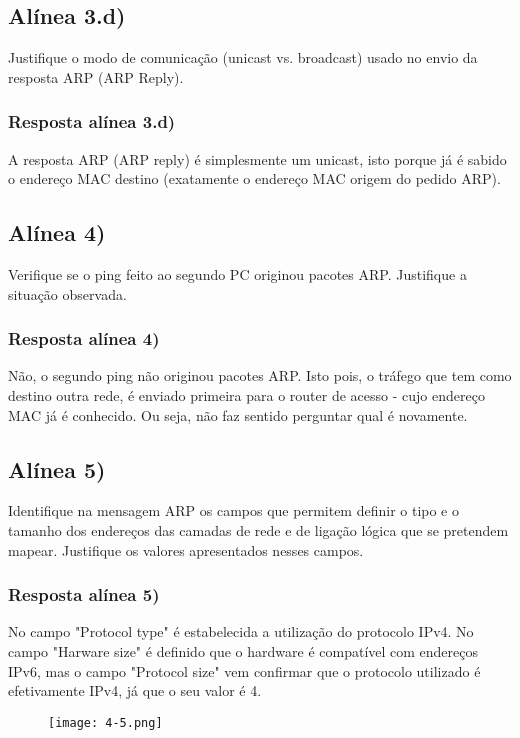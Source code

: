 \documentclass{article}
\begin{document}
\subsection{Alínea 3.d)}

Justifique o modo de comunicação (unicast vs. broadcast) usado no envio da resposta ARP (ARP Reply).

\subsubsection{Resposta alínea 3.d)}

A resposta ARP (ARP reply) é simplesmente um unicast, isto porque já é sabido o endereço MAC destino (exatamente o endereço MAC origem do pedido ARP).

\subsection{Alínea 4)}

Verifique se o ping feito ao segundo PC originou pacotes ARP. Justifique a situação observada.

\subsubsection{Resposta alínea 4)}

Não, o segundo ping não originou pacotes ARP. Isto pois, o tráfego que tem como destino outra rede, é enviado primeira para o router de acesso - cujo endereço MAC já é conhecido. Ou seja, não faz sentido perguntar qual é novamente.

\subsection{Alínea 5)}

Identifique na mensagem ARP os campos que permitem definir o tipo e o tamanho dos endereços das camadas de rede e de ligação lógica que se pretendem mapear. Justifique os valores apresentados nesses campos.

\subsubsection{Resposta alínea 5)}

No campo "Protocol type" é estabelecida a utilização do protocolo IPv4. No campo "Harware size" é definido que o hardware é compatível com endereços IPv6, mas o campo "Protocol size" vem confirmar que o protocolo utilizado é efetivamente IPv4, já que o seu valor é 4. 
\begin{figure}[h]
    \centering
    \texttt{[image: 4-5.png]}
\end{figure}
\end{document}
